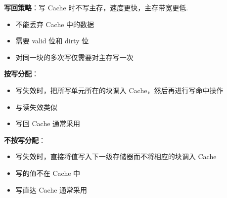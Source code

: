 \documentclass[cn, hazy, blue, normal, 12pt]{elegantnote}
\begin{document}
\textbf{写回策略}：写 Cache 时不写主存，速度更快，主存带宽更低.
\begin{itemize}
    \item 不能丢弃 Cache 中的数据
    \item 需要 valid 位和 dirty 位
    \item 对同一块的多次写仅需要对主存写一次
\end{itemize}


\textbf{按写分配}：
\begin{itemize}
    \item 写失效时，把所写单元所在的块调入 Cache，然后再进行写命中操作
    \item 与读失效类似
    \item 写回 Cache 通常采用
\end{itemize}

\textbf{不按写分配}：
\begin{itemize}
    \item 写失效时，直接将值写入下一级存储器而不将相应的块调入 Cache
    \item 写的值不在 Cache 中
    \item 写直达 Cache 通常采用
\end{itemize}
\end{document}
